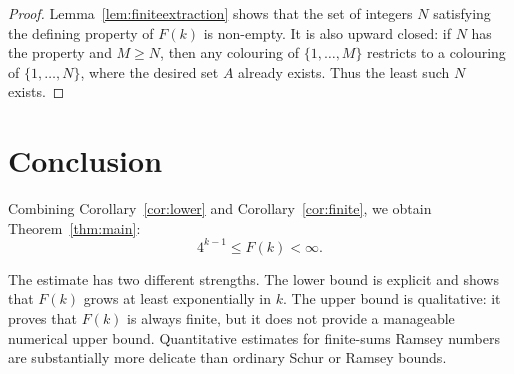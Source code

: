 \documentclass[11pt]{article}
\begin{document}
\begin{proof}
Lemma~\ref{lem:finiteextraction} shows that the set of integers $N$ satisfying the defining property of $F(k)$ is non-empty. It is also upward closed: if $N$ has the property and $M\geq N$, then any colouring of $\{1,\ldots,M\}$ restricts to a colouring of $\{1,\ldots,N\}$, where the desired set $A$ already exists. Thus the least such $N$ exists.
\end{proof}

\section{Conclusion}

Combining Corollary~\ref{cor:lower} and Corollary~\ref{cor:finite}, we obtain Theorem~\ref{thm:main}:
\[
    4^{k-1}\leq F(k)<\infty .
\]

The estimate has two different strengths. The lower bound is explicit and shows that $F(k)$ grows at least exponentially in $k$. The upper bound is qualitative: it proves that $F(k)$ is always finite, but it does not provide a manageable numerical upper bound. Quantitative estimates for finite-sums Ramsey numbers are substantially more delicate than ordinary Schur or Ramsey bounds.
\end{document}
